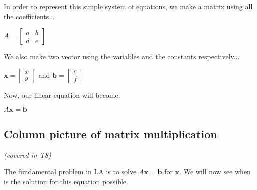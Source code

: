 \documentclass[a4paper]{article}
\begin{document}
In order to represent this simple system of equations, we make a matrix using all the coefficients...
\begin{center}
    $A = \begin{bmatrix}
        a & b \\
        d & e 
    \end{bmatrix}$
\end{center}

We also make two vector using the variables and the constants respectively...
\begin{center}
    $\textbf{x} = \begin{bmatrix}
        x \\
        y 
    \end{bmatrix}$ \hspace{5px} 
    and \hspace{5px}
$\textbf{b} = \begin{bmatrix}
        c \\
        f 
    \end{bmatrix}$ 
\end{center}

Now, our linear equation will become:
\begin{center}
    $A\textbf{x} = \textbf{b}$
\end{center}

\subsection{Column picture of matrix multiplication}
\textit{(covered in T8)}

The fundamental problem in LA is to solve $A\textbf{x} = \textbf{b}$ for $\textbf{x}$. We will now see when is the solution for this equation possible.
\end{document}
